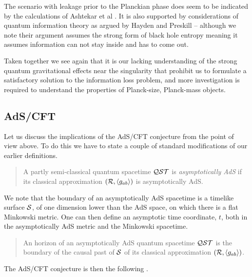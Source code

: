 \documentclass[12pt]{article}
\begin{document}
The scenario with leakage prior to the Planckian phase does seem to be indicated by the calculations of Ashtekar et al \cite{Ashtekar:2008jd}. It is also supported
by considerations of quantum information theory as argued by Hayden and Preskill \cite{Hayden:2007cs} -- although we note their argument 
assumes the strong form of black hole entropy meaning it assumes information can not stay inside and has to come out.  

Taken together we see again that it is our lacking understanding of the strong quantum gravitational effects near the
singularity that prohibit us to formulate a satisfactory solution to the information loss problem, and more investigation
is required to understand the properties of Planck-size, Planck-mass objects. 

\subsection{AdS/CFT}

Let us discuss the implications of the AdS/CFT conjecture from the point of view above.  To do this we have to state a 
couple of standard modifications of our earlier definitions. 

\begin{quotation}

A partly semi-classical quantum spacetime ${\cal Q}{\cal S}{\cal T}$ is {\it asymptotically AdS} if its classical approximation
$({\cal R}, \langle g_{ab} \rangle ) $ is asymptotically AdS.  

\end{quotation}

We note that the boundary of an asymptotically AdS spacetime is a timelike surface $\cal S$, of one dimension lower than the AdS space, on which there is
a flat Minkowski metric.  One can then define an asymptotic time coordinate, $t$, both in the asymptotically AdS metric and the Minkowski spacetime.  

\begin{quotation}

An horizon of an asymptotically AdS quantum spacetime ${\cal Q}{\cal S}{\cal T}$ is the boundary of  the causal past of $\cal S$ of its classical approximation $({\cal R}, \langle g_{ab} \rangle ) $.  

\end{quotation}

The AdS/CFT conjecture is then the following \cite{ads}.  
\end{document}

